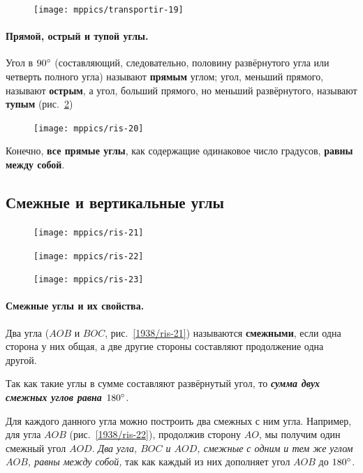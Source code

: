 \documentclass[oneside]{book}
\begin{document}
\begin{figure}[h!]
\centering
\texttt{[image: mppics/transportir-19]}
\caption{}\label{1938/ris-19}
\end{figure}

\paragraph{Прямой, острый и тупой углы.}\label{1938/21}
Угол в $90\degree$ (составляющий, следовательно, половину развёрнутого угла или четверть полного угла) называют \textbf{прямым} углом;
угол, меньший прямого, называют \textbf{острым}, а угол, больший прямого, но меньший развёрнутого, называют \textbf{тупым} (рис.~\ref{1938/ris-20})

\begin{figure}[h!]
\centering
\texttt{[image: mppics/ris-20]}
\caption{}\label{1938/ris-20}
\end{figure}

Конечно, \textbf{все прямые углы}, как содержащие одинаковое число градусов, \textbf{равны между собой}.

\pagebreak%

\subsection*{Смежные и вертикальные углы}

\begin{figure}
\centering
\texttt{[image: mppics/ris-21]}
\caption{}\label{1938/ris-21}
\bigskip
\texttt{[image: mppics/ris-22]}
\caption{}\label{1938/ris-22}
\bigskip
\texttt{[image: mppics/ris-23]}
\caption{}\label{1938/ris-23}
\end{figure}

\paragraph{Смежные углы и их свойства.}\label{1938/22}
Два угла ($AOB$ и $BOC$, рис.~\ref{1938/ris-21}) называются \textbf{смежными}, если одна сторона у них общая, а две другие стороны составляют продолжение одна другой.

Так как такие углы в сумме составляют развёрнутый угол, то \textbf{\emph{сумма двух смежных углов равна $180\degree$}}.

Для каждого данного угла можно построить два смежных с ним угла.
Например, для угла $AOB$ (рис.~\ref{1938/ris-22}), продолжив сторону $AO$, мы получим один смежный угол $AOD$.
\emph{Два угла, $BOC$ и $AOD$, смежные с одним и тем же углом $AOB$, равны между собой,} так как каждый из них дополняет угол $AOB$ до $180\degree$.
\end{document}
